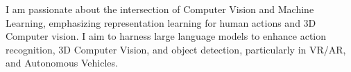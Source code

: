 


\begin{cventries}

\cvtext
{ %
\begin{cvitems}
    I am passionate about the intersection of Computer Vision and Machine Learning, emphasizing representation learning for human actions and 3D Computer vision. 
    I aim to harness large language models to enhance action recognition, 3D Computer Vision, and object detection, particularly in VR/AR, and Autonomous Vehicles.
\end{cvitems}
}


\end{cventries}
